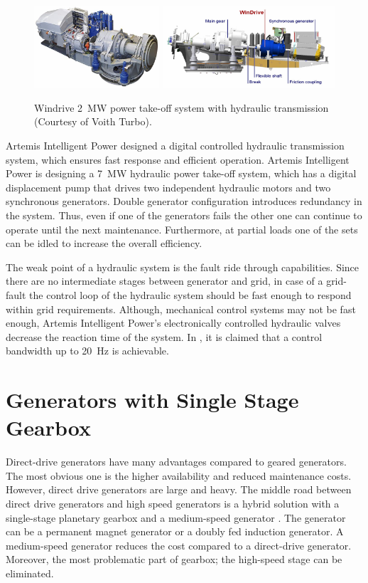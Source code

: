 \documentclass[a4paper, 11pt]{article} %
\begin{document}
  \begin{figure}
    \centering
    \includegraphics[height=1.2in]{voith_windrive}
    \includegraphics[height=1.2in]{voith_schematic}
    \caption{Windrive 2~MW power take-off system with hydraulic transmission (Courtesy of Voith Turbo).} 
    \label{voith}
  \end{figure}

Artemis Intelligent Power designed a digital controlled hydraulic transmission system, which ensures fast response and efficient operation. Artemis Intelligent Power is designing a 7~MW hydraulic power take-off system, which has a digital displacement pump that drives two independent hydraulic motors and two synchronous generators. Double generator configuration introduces redundancy in the system. Thus, even if one of the generators fails the other one can continue to operate until the next maintenance. Furthermore, at partial loads one of the sets can be idled to increase the overall efficiency.

The weak point of a hydraulic system is the fault ride through capabilities. Since there are no intermediate stages between generator and grid, in case of a grid-fault the control loop of the hydraulic system should be fast enough to respond within grid requirements. Although, mechanical control systems may not be fast enough, Artemis Intelligent Power's electronically controlled hydraulic valves decrease the reaction time of the system. In \cite{artemis}, it is claimed that a control bandwidth up to 20~Hz is achievable.

\section{Generators with Single Stage Gearbox}

Direct-drive generators have many advantages compared to geared generators. The most obvious one is the higher availability and reduced maintenance costs. However, direct drive generators are large and heavy. The middle road between direct drive generators and high speed generators is a hybrid solution with a single-stage planetary gearbox and a medium-speed generator \cite{Li2009}. The generator can be a permanent magnet generator or a doubly fed induction generator. A medium-speed generator reduces the cost compared to a direct-drive generator. Moreover, the most problematic part of gearbox; the high-speed stage can be eliminated.
\end{document}
